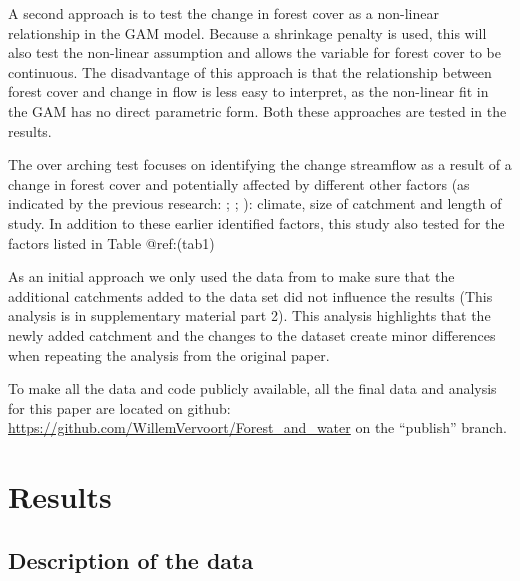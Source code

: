 \documentclass[]{elsarticle} %
\begin{document}
A second approach is to test the change in forest cover as a non-linear relationship in the GAM model. Because a shrinkage penalty is used, this will also test the non-linear assumption and allows the variable for forest cover to be continuous. The disadvantage of this approach is that the relationship between forest cover and change in flow is less easy to interpret, as the non-linear fit in the GAM has no direct parametric form.
Both these approaches are tested in the results.

The over arching test focuses on identifying the change streamflow as a result of a change in forest cover and potentially affected by different other factors (as indicated by the previous research: \citet{zhang2017}; \citet{filoso2017}; \citet{zhou2015}): climate, size of catchment and length of study. In addition to these earlier identified factors, this study also tested for the factors listed in Table @ref:(tab1)

As an initial approach we only used the data from \citet{zhang2017} to make sure that the additional catchments added to the data set did not influence the results (This analysis is in supplementary material part 2). This analysis highlights that the newly added catchment and the changes to the dataset create minor differences when repeating the analysis from the original paper.

To make all the data and code publicly available, all the final data and analysis for this paper are located on github:\\
\href{https://github.com/WillemVervoort/Forest_and_water/tree/publish}{https://github.com/WillemVervoort/Forest\_and\_water} on the ``publish'' branch.

\hypertarget{results}{%
\section{Results}\label{results}}

\hypertarget{description-of-the-data}{%
\subsection{Description of the data}\label{description-of-the-data}}
\end{document}
